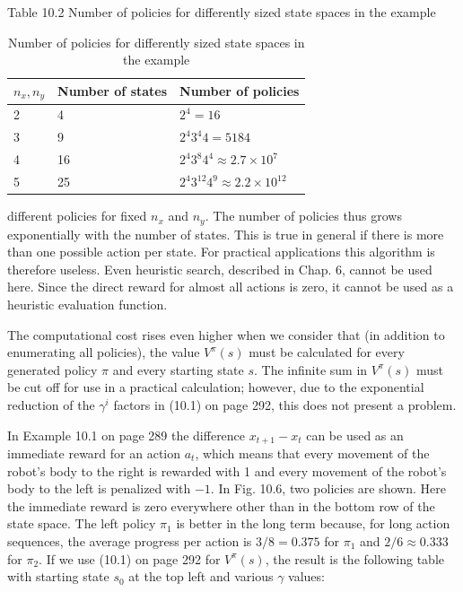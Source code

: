 \documentclass[10pt]{book}
\begin{document}
Table 10.2 Number of policies for differently sized state spaces in the example
\begin{table}[htbp]
\centering
\caption{Number of policies for differently sized state spaces in the example}
\begin{tabular}{lll}
\hline
$n_{x}, n_{y}$ & Number of states & Number of policies \\
\hline
2 & 4 & $2^{4}=16$ \\
\hline
3 & 9 & $2^{4} 3^{4} 4=5184$ \\
\hline
4 & 16 & $2^{4} 3^{8} 4^{4} \approx 2.7 \times 10^{7}$ \\
\hline
5 & 25 & $2^{4} 3^{12} 4^{9} \approx 2.2 \times 10^{12}$ \\
\hline
\end{tabular}
\end{table}

different policies for fixed $n_{x}$ and $n_{y}$. The number of policies thus grows exponentially with the number of states. This is true in general if there is more than one possible action per state. For practical applications this algorithm is therefore useless. Even heuristic search, described in Chap. 6, cannot be used here. Since the direct reward for almost all actions is zero, it cannot be used as a heuristic evaluation function.

The computational cost rises even higher when we consider that (in addition to enumerating all policies), the value $V^{\pi}(s)$ must be calculated for every generated policy $\pi$ and every starting state $s$. The infinite sum in $V^{\pi}(s)$ must be cut off for use in a practical calculation; however, due to the exponential reduction of the $\gamma^{i}$ factors in (10.1) on page 292, this does not present a problem.

In Example 10.1 on page 289 the difference $x_{t+1}-x_{t}$ can be used as an immediate reward for an action $a_{t}$, which means that every movement of the robot's body to the right is rewarded with 1 and every movement of the robot's body to the left is penalized with $-1$. In Fig. 10.6, two policies are shown. Here the immediate reward is zero everywhere other than in the bottom row of the state space. The left policy $\pi_{1}$ is better in the long term because, for long action sequences, the average progress per action is $3/8=0.375$ for $\pi_{1}$ and $2/6 \approx 0.333$ for $\pi_{2}$. If we use (10.1) on page 292 for $V^{\pi}(s)$, the result is the following table with starting state $s_{0}$ at the top left and various $\gamma$ values:
\end{document}
